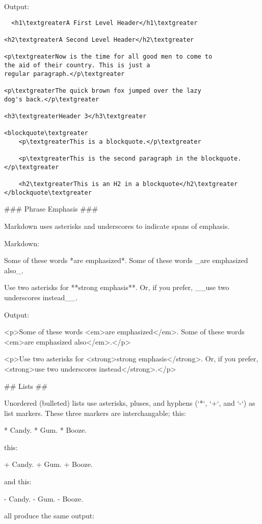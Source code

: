 Output:
\begin{verbatim}
  <h1\textgreaterA First Level Header</h1\textgreater

<h2\textgreaterA Second Level Header</h2\textgreater

<p\textgreaterNow is the time for all good men to come to
the aid of their country. This is just a
regular paragraph.</p\textgreater

<p\textgreaterThe quick brown fox jumped over the lazy
dog's back.</p\textgreater

<h3\textgreaterHeader 3</h3\textgreater

<blockquote\textgreater
    <p\textgreaterThis is a blockquote.</p\textgreater
    
    <p\textgreaterThis is the second paragraph in the blockquote.</p\textgreater
    
    <h2\textgreaterThis is an H2 in a blockquote</h2\textgreater
</blockquote\textgreater
\end{verbatim}


### Phrase Emphasis ###

Markdown uses asterisks and underscores to indicate spans of emphasis.

Markdown:

    Some of these words *are emphasized*.
    Some of these words _are emphasized also_.
    
    Use two asterisks for **strong emphasis**.
    Or, if you prefer, __use two underscores instead__.

Output:

    <p>Some of these words <em>are emphasized</em>.
    Some of these words <em>are emphasized also</em>.</p>
    
    <p>Use two asterisks for <strong>strong emphasis</strong>.
    Or, if you prefer, <strong>use two underscores instead</strong>.</p>
   


## Lists ##

Unordered (bulleted) lists use asterisks, pluses, and hyphens (`*`,
`+`, and `-`) as list markers. These three markers are
interchangable; this:

    *   Candy.
    *   Gum.
    *   Booze.

this:

    +   Candy.
    +   Gum.
    +   Booze.

and this:

    -   Candy.
    -   Gum.
    -   Booze.

all produce the same output:


